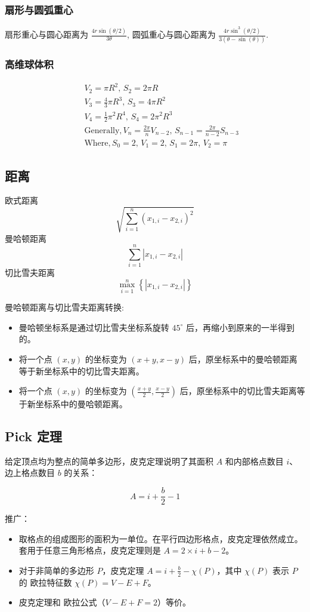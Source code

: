 \begin{small}
\begin{spacing}{0.5}
\subsubsection{扇形与圆弧重心}
扇形重心与圆心距离为 $\frac{4r\sin(\theta/2)}{3\theta}$,
圆弧重心与圆心距离为 $\frac{4r\sin^3(\theta/2)}{3(\theta-\sin(\theta))}$.
\subsubsection{高维球体积}
\begin{eqnarray*}
&& V_2=\pi R^2,\, S_2=2\pi R \\
&& V_3=\frac{4}{3}\pi R^3,\, S_3=4\pi R^2 \\
&& V_4=\frac{1}{2}\pi ^2 R^4,\, S_4=2\pi ^2 R^3 \\
&& \mathrm{Generally}, V_n=\frac{2\pi}{n}V_{n-2},\, S_{n-1}=\frac{2\pi}{n-2}S_{n-3} \\
&& \mathrm{Where}, S_0=2,\, V_1=2,\, S_1=2\pi ,\, V_2=\pi
\end{eqnarray*}
\subsection{距离}
欧式距离 \[\sqrt{\sum_{i=1}^n (x_{1,i}-x_{2,i})^2}\]
曼哈顿距离 \[\sum_{i=1}^n \left|x_{1,i}-x_{2,i}\right|\]
切比雪夫距离 \[\max_{i=1}^n \left\{\left|x_{1,i}-x_{2,i}\right|\right\}\]

曼哈顿距离与切比雪夫距离转换:
\begin{itemize}
\item 曼哈顿坐标系是通过切比雪夫坐标系旋转 $45^\circ$ 后，再缩小到原来的一半得到的。
\item 将一个点 $(x,y)$ 的坐标变为 $(x + y, x - y)$ 后，原坐标系中的曼哈顿距离等于新坐标系中的切比雪夫距离。
\item 将一个点 $(x,y)$ 的坐标变为 $(\frac{x + y}{2},\frac{x - y}{2})$ 后，原坐标系中的切比雪夫距离等于新坐标系中的曼哈顿距离。
\end{itemize}

\subsection{Pick 定理}
给定顶点均为整点的简单多边形，皮克定理说明了其面积 $A$ 和内部格点数目 $i$、边上格点数目 $b$ 的关系：
 
\[ A=i+{\frac {b}{2}}-1\]

推广：
\begin{itemize}
\item 取格点的组成图形的面积为一单位。在平行四边形格点，皮克定理依然成立。套用于任意三角形格点，皮克定理则是 $A=2 \times i+b-2$。
\item 对于非简单的多边形 $P$，皮克定理 $A=i+{\frac {b}{2}}-\chi (P)$，其中 $\chi (P)$ 表示 $P$ 的 欧拉特征数 $\chi(P) = V - E + F$。
\item 皮克定理和 欧拉公式（$V-E+F=2$）等价。
\end{itemize}

\end{spacing}
\end{small}
